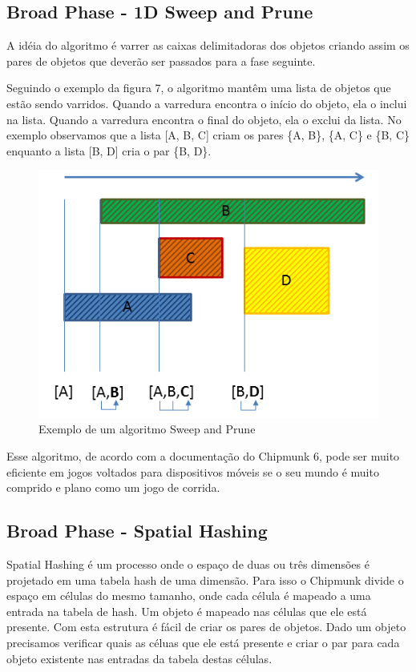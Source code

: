 \subsection{Broad Phase - 1D Sweep and Prune}

A idéia do algoritmo é varrer as caixas delimitadoras dos objetos criando assim os pares de objetos que deverão ser passados para a fase seguinte. 

Seguindo o exemplo da figura 7, o algoritmo mantêm uma lista de objetos que estão sendo varridos. Quando a varredura encontra o início do objeto, ela o inclui na lista. 
Quando a varredura encontra o final do objeto, ela o exclui da lista. No exemplo observamos que a lista [A, B, C] criam os pares \{A, B\}, \{A, C\} e \{B, C\} 
enquanto a lista [B, D] cria o par \{B, D\}. 

\begin{figure}[!htbp]
  \includegraphics[scale=0.7]{sp.png}
  \caption{Exemplo de um algoritmo Sweep and Prune}
\end{figure}

Esse algoritmo, de acordo com a documentação do Chipmunk 6, pode ser muito eficiente em jogos voltados para dispositivos móveis se o seu mundo é muito comprido 
e plano como um jogo de corrida.

\subsection{Broad Phase - Spatial Hashing}

Spatial Hashing é um processo onde o espaço de duas ou três dimensões é projetado em uma tabela hash de uma dimensão. Para isso o Chipmunk divide o espaço em 
células do mesmo tamanho, onde cada célula é mapeado a uma entrada na tabela de hash. Um objeto é mapeado nas células que ele está presente. Com esta estrutura 
  é fácil de criar os pares de objetos. Dado um objeto precisamos verificar quais as céluas que ele está presente e criar o par para cada objeto existente nas 
entradas da tabela destas células.


